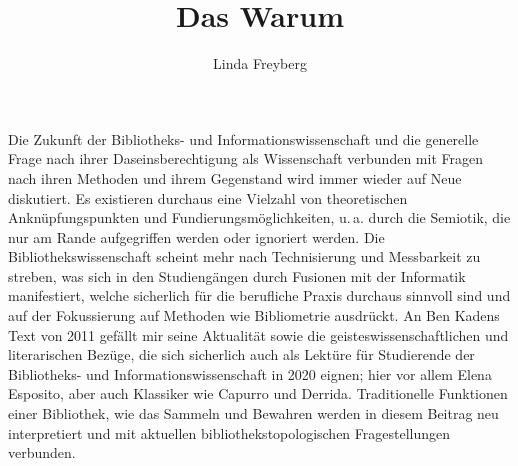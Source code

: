 \documentclass[output=paper]{langsci/langscibook}
\title{Das Warum}
\author{Linda Freyberg}
\begin{document}
\maketitle

\noindent Die Zukunft der Bibliotheks- und Informationswissenschaft und die generelle Frage nach ihrer Daseinsberechtigung als Wissenschaft verbunden mit Fragen nach ihren Methoden und ihrem Gegenstand wird immer wieder auf Neue diskutiert. Es existieren durchaus eine Vielzahl von theoretischen Anknüpfungspunkten und Fundierungsmöglichkeiten, u.\,a. durch die Semiotik, die nur am Rande aufgegriffen werden oder ignoriert werden. Die Bibliothekswissenschaft scheint mehr nach Technisierung und Messbarkeit zu streben, was sich in den Studiengängen durch Fusionen mit der Informatik manifestiert, welche sicherlich für die berufliche Praxis durchaus sinnvoll sind und auf der Fokussierung auf Methoden wie Bibliometrie ausdrückt. An Ben Kadens Text von 2011 gefällt mir seine Aktualität sowie die geisteswissenschaftlichen und literarischen Bezüge, die sich sicherlich auch als Lektüre für Studierende der Bibliotheks- und Informationswissenschaft in 2020 eignen; hier vor allem Elena Esposito, aber auch Klassiker wie Capurro und Derrida. Traditionelle Funktionen einer Bibliothek, wie das Sammeln und Bewahren werden in diesem Beitrag neu interpretiert und mit aktuellen bibliothekstopologischen Fragestellungen verbunden.
\end{document}

